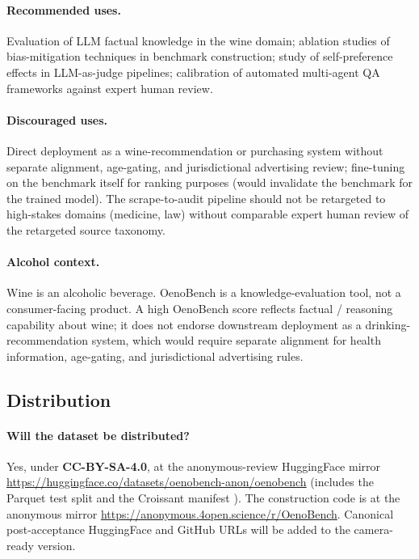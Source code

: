 \paragraph{Recommended uses.} Evaluation of LLM factual knowledge in
the wine domain; ablation studies of bias-mitigation techniques in
benchmark construction; study of self-preference effects in
LLM-as-judge pipelines; calibration of automated multi-agent QA
frameworks against expert human review.

\paragraph{Discouraged uses.} Direct deployment as a wine-recommendation
or purchasing system without separate alignment, age-gating, and
jurisdictional advertising review; fine-tuning on the benchmark itself
for ranking purposes (would invalidate the benchmark for the trained
model). The scrape-to-audit pipeline should not be retargeted to
high-stakes domains (medicine, law) without comparable expert human
review of the retargeted source taxonomy.

\paragraph{Alcohol context.} Wine is an alcoholic beverage. OenoBench
is a knowledge-evaluation tool, not a consumer-facing product. A
high OenoBench score reflects factual / reasoning capability about
wine; it does not endorse downstream deployment as a
drinking-recommendation system, which would require separate
alignment for health information, age-gating, and jurisdictional
advertising rules.

\subsection{Distribution}
\paragraph{Will the dataset be distributed?}
Yes, under \textbf{CC-BY-SA-4.0}, at the anonymous-review HuggingFace
mirror \url{https://huggingface.co/datasets/oenobench-anon/oenobench}
(includes the Parquet test split and the Croissant manifest
\citep{koehn2024croissant}). The construction code is at the anonymous
mirror \url{https://anonymous.4open.science/r/OenoBench}. Canonical
post-acceptance HuggingFace and GitHub URLs will be added to the
camera-ready version.

